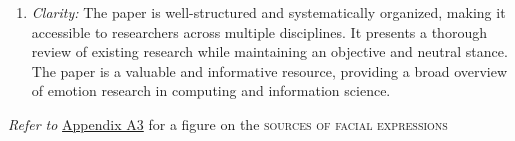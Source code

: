 \begin{enumerate}
    \item \textit{Clarity: }The paper is well-structured and systematically organized, making it accessible to researchers across multiple disciplines. It presents a thorough review of existing research while maintaining an objective and neutral stance. The paper is a valuable and informative resource, providing a broad overview of emotion research in computing and information science.
\end{enumerate}

    \textit{Refer to} \hyperref[fig3]{Appendix A3} for a figure on the \textsc{sources of facial expressions}
